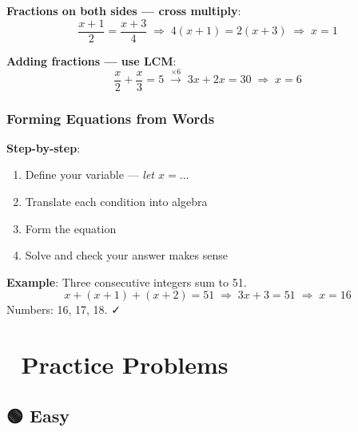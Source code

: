 \documentclass[
  letterpaper,
  DIV=11,
  numbers=noendperiod]{scrreprt}
\providecommand{\tightlist}{%
  \setlength{\itemsep}{0pt}\setlength{\parskip}{0pt}}
\theoremstyle{definition}
\theoremstyle{remark}
\begin{document}
\textbf{Fractions on both sides --- cross multiply}:
\[\dfrac{x + 1}{2} = \dfrac{x + 3}{4} \;\Rightarrow\; 4(x+1) = 2(x+3) \;\Rightarrow\; x = 1\]

\textbf{Adding fractions --- use LCM}:
\[\dfrac{x}{2} + \dfrac{x}{3} = 5 \;\xrightarrow{\times 6}\; 3x + 2x = 30 \;\Rightarrow\; x = 6\]

\subsubsection*{Forming Equations from
Words}\label{forming-equations-from-words}

\textbf{Step-by-step}:

\begin{enumerate}
\def\labelenumi{\arabic{enumi}.}
\tightlist
\item
  Define your variable --- \emph{let \(x = \ldots\)}
\item
  Translate each condition into algebra
\item
  Form the equation
\item
  Solve and check your answer makes sense
\end{enumerate}

\textbf{Example}: Three consecutive integers sum to 51.
\[x + (x+1) + (x+2) = 51 \;\Rightarrow\; 3x + 3 = 51 \;\Rightarrow\; x = 16\]
Numbers: 16, 17, 18. ✓

\section{📝 Practice Problems}\label{practice-problems-2}

\subsection{🟢 Easy}
\end{document}
